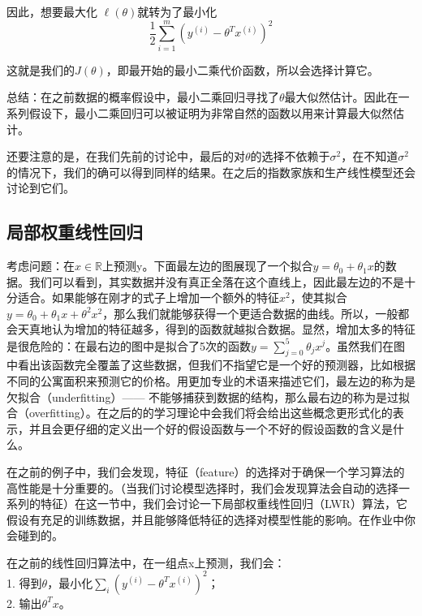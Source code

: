 \documentclass[UTF8]{ctexart}
\begin{document}
因此，想要最大化 $\ell(\theta)$就转为了最小化\[\frac{1}{2} \sum_{i=1}^{m}{(y^{(i)}-\theta^{T}x^{(i)})^2}\]

这就是我们的$J(\theta)$，即最开始的最小二乘代价函数，所以会选择计算它。


总结：在之前数据的概率假设中，最小二乘回归寻找了$\theta$最大似然估计。因此在一系列假设下，最小二乘回归可以被证明为非常自然的函数以用来计算最大似然估计。

还要注意的是，在我们先前的讨论中，最后的对$\theta$的选择不依赖于$\sigma^{2}$，在不知道$\sigma^{2}$的情况下，我们的确可以得到同样的结果。在之后的指数家族和生产线性模型还会讨论到它们。



\subsection{局部权重线性回归}


考虑问题：在$x \in \mathbb{R}$上预测y。下面最左边的图展现了一个拟合$y=\theta_{0}+\theta_{1}x$的数据。我们可以看到，其实数据并没有真正全落在这个直线上，因此最左边的不是十分适合。如果能够在刚才的式子上增加一个额外的特征$x^{2}$，使其拟合$y=\theta_{0}+\theta_{1}x+\theta^{2}x^{2}$，那么我们就能够获得一个更适合数据的曲线。所以，一般都会天真地认为增加的特征越多，得到的函数就越拟合数据。显然，增加太多的特征是很危险的：在最右边的图中是拟合了5次的函数$y=\sum_{j=0}^{5}\theta_{j}x^{j}$。虽然我们在图中看出该函数完全覆盖了这些数据，但我们不指望它是一个好的预测器，比如根据不同的公寓面积来预测它的价格。用更加专业的术语来描述它们，最左边的称为是欠拟合（underfitting）—— 不能够捕获到数据的结构，那么最右边的称为是过拟合（overfitting）。在之后的的学习理论中会我们将会给出这些概念更形式化的表示，并且会更仔细的定义出一个好的假设函数与一个不好的假设函数的含义是什么。

\begin{figure}[htb]        
\end{figure}

在之前的例子中，我们会发现，特征（feature）的选择对于确保一个学习算法的高性能是十分重要的。（当我们讨论模型选择时，我们会发现算法会自动的选择一系列的特征）在这一节中，我们会讨论一下局部权重线性回归（LWR）算法，它假设有充足的训练数据，并且能够降低特征的选择对模型性能的影响。在作业中你会碰到的。

在之前的线性回归算法中，在一组点x上预测，我们会：\\
1. 得到$\theta$，最小化$\sum_{i}(y^{(i)}-\theta^{T}x^{(i)})^{2}$； \\
2. 输出$\theta^{T}x$。
\end{document}
